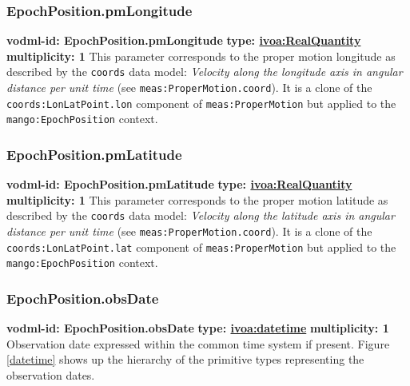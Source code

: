     \subsubsection{EpochPosition.pmLongitude}
      \textbf{vodml-id: EpochPosition.pmLongitude} \newline
      \textbf{type: \hyperref[sect:ivoa]{ivoa:RealQuantity}} \newline
      \textbf{multiplicity: 1} \newline
      This parameter corresponds to the proper motion longitude as described by the \texttt{coords} data model: \textit{Velocity along the longitude axis in angular distance per unit time} (see \texttt{meas:ProperMotion.coord}). It is a clone of the \texttt{coords:LonLatPoint.lon} component of \texttt{meas:ProperMotion} but applied to the \texttt{mango:EpochPosition} context.

    \subsubsection{EpochPosition.pmLatitude}
      \textbf{vodml-id: EpochPosition.pmLatitude} \newline
      \textbf{type: \hyperref[sect:ivoa]{ivoa:RealQuantity}} \newline
      \textbf{multiplicity: 1} \newline
      This parameter corresponds to the proper motion latitude as described by the \texttt{coords} data model: \textit{Velocity along the latitude axis in angular distance per unit time} (see \texttt{meas:ProperMotion.coord}). It is a clone of the \texttt{coords:LonLatPoint.lat} component of \texttt{meas:ProperMotion} but applied to the \texttt{mango:EpochPosition} context.

    \subsubsection{EpochPosition.obsDate}
      \textbf{vodml-id: EpochPosition.obsDate} \newline
      \textbf{type: \hyperref[sect:ivoa]{ivoa:datetime}} \newline
      \textbf{multiplicity: 1} \newline
      Observation date expressed within the common time system if present. Figure \ref{datetime} shows up the hierarchy of the primitive types representing the observation dates.

